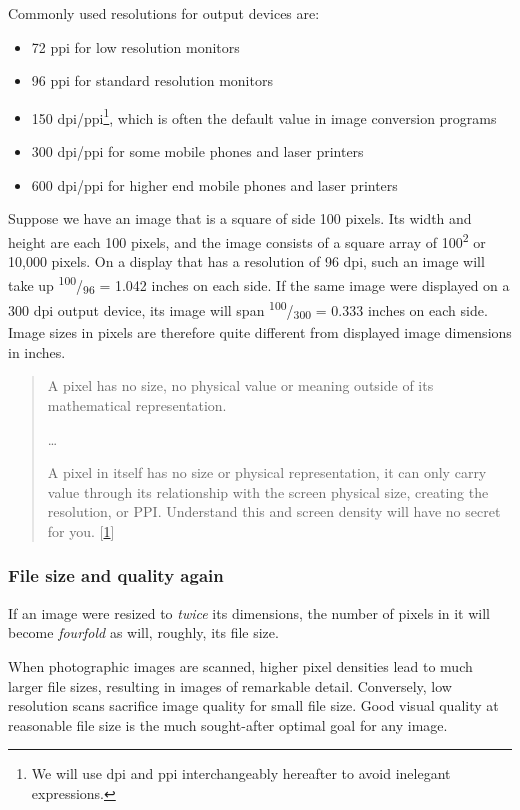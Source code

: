 \documentclass[
  a4paper,
]{article}
\providecommand{\tightlist}{%
  \setlength{\itemsep}{0pt}\setlength{\parskip}{0pt}}
\begin{document}
Commonly used resolutions for output devices are:

\begin{itemize}
\tightlist
\item
  72 ppi for low resolution monitors
\item
  96 ppi for standard resolution monitors
\item
  150 dpi/ppi\footnote{We will use dpi and ppi interchangeably hereafter
    to avoid inelegant expressions.}, which is often the default value
  in image conversion programs
\item
  300 dpi/ppi for some mobile phones and laser printers
\item
  600 dpi/ppi for higher end mobile phones and laser printers
\end{itemize}

Suppose we have an image that is a square of side 100 pixels. Its width
and height are each 100 pixels, and the image consists of a square array
of 100\textsuperscript{2} or 10,000 pixels. On a display that has a
resolution of 96 dpi, such an image will take up
\textsuperscript{100}/\textsubscript{96} = 1.042 inches on each side. If
the same image were displayed on a 300 dpi output device, its image will
span \textsuperscript{100}/\textsubscript{300} = 0.333 inches on each
side. Image sizes in pixels are therefore quite different from displayed
image dimensions in inches.

\begin{quote}
A pixel has no size, no physical value or meaning outside of its
mathematical representation.

\ldots{}

A pixel in itself has no size or physical representation, it can only
carry value through its relationship with the screen physical size,
creating the resolution, or PPI. Understand this and screen density will
have no secret for you. {[}\protect\hyperlink{ref-gabriel2017}{1}{]}
\end{quote}

\hypertarget{file-size-and-quality-again}{%
\subsubsection{File size and quality
again}\label{file-size-and-quality-again}}

If an image were resized to \emph{twice} its dimensions, the number of
pixels in it will become \emph{fourfold} as will, roughly, its file
size.

When photographic images are scanned, higher pixel densities lead to
much larger file sizes, resulting in images of remarkable detail.
Conversely, low resolution scans sacrifice image quality for small file
size. Good visual quality at reasonable file size is the much
sought-after optimal goal for any image.
\end{document}
